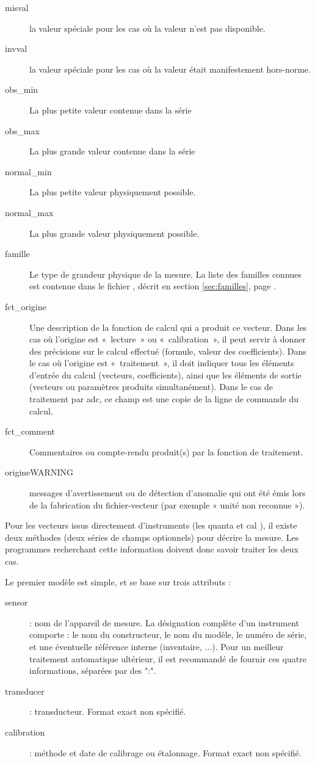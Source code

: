 \begin{description}
   \item[misval] la valeur spéciale pour les cas où la valeur
           n'est pas disponible.
   \item[invval] la valeur spéciale pour les cas où la valeur
           était manifestement hors-norme.
   \item[obs\_min] La plus petite valeur contenue dans la série
   \item[obs\_max] La plus grande valeur contenue dans la série
   \item[normal\_min] La plus petite valeur physiquement possible.
   \item[normal\_max] La plus grande valeur physiquement possible.
   \item[famille] Le type de grandeur physique de la mesure. La liste des
familles connues est contenue dans le fichier , décrit
en section \ref{sec:familles}, page \pageref{sec:familles}.
   \item[fct\_origine] Une description de la fonction de calcul qui a
produit ce vecteur.  Dans les cas où l'origine est «~lecture~» ou
«~calibration~», il peut servir à donner des précisions sur le calcul
effectué (formule, valeur des coefficients). Dans le cas où l'origine
est «~traitement~», il doit indiquer
tous les éléments d'entrée du calcul (vecteurs, coefficients), ainsi
que les éléments de sortie (vecteurs ou paramètres produits
simultanément). Dans le cas de traitement par adc, ce champ est une copie
de la ligne de commande du calcul.
   \item[fct\_comment] Commentaires ou compte-rendu produit(s) par la
fonction de traitement.
   \item[origine\-WARNING] messages d'avertissement ou de détection
d'anomalie qui ont été émis lors de la fabrication du fichier-vecteur
(par exemple « unité non reconnue »).

\end{description}

  Pour les vecteurs issus directement d'instruments (les \og quanta\fg{}
et \og cal\fg{} ), il existe deux méthodes (deux séries de champs optionnels)
pour décrire la mesure. Les programmes recherchant cette information doivent
donc savoir traiter les deux cas.

Le premier modèle est simple, et se base sur trois attributs :
\begin{description}
   \item[sensor] : nom de l'appareil de mesure.
La désignation complète d'un instrument comporte : le nom du constructeur,
le nom du modèle, le numéro de série, et une éventuelle référence interne 
(inventaire, ...).
Pour un meilleur traitement automatique ultérieur, il est recommandé de  
fournir ces quatre informations, séparées par des ":".
   \item[transducer] : transducteur. Format exact non spécifié.
   \item[calibration] : méthode et date de calibrage ou étalonnage. Format exact
non spécifié.
\end{description}

